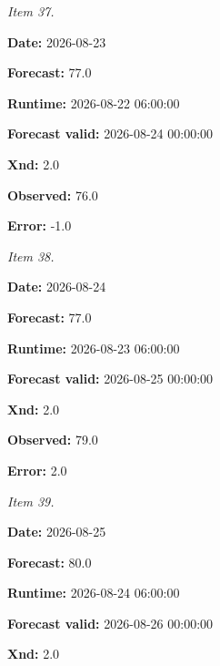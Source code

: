 \documentclass[11pt]{article}
\begin{document}
\par\noindent\textit{Item 37.}\par \par\noindent\textbf{Date:} 2026-08-23

\par\noindent\textbf{Forecast:} 77.0

\par\noindent\textbf{Runtime:} 2026-08-22 06:00:00

\par\noindent\textbf{Forecast valid:} 2026-08-24 00:00:00

\par\noindent\textbf{Xnd:} 2.0

\par\noindent\textbf{Observed:} 76.0

\par\noindent\textbf{Error:} -1.0

\par\noindent\textit{Item 38.}\par \par\noindent\textbf{Date:} 2026-08-24

\par\noindent\textbf{Forecast:} 77.0

\par\noindent\textbf{Runtime:} 2026-08-23 06:00:00

\par\noindent\textbf{Forecast valid:} 2026-08-25 00:00:00

\par\noindent\textbf{Xnd:} 2.0

\par\noindent\textbf{Observed:} 79.0

\par\noindent\textbf{Error:} 2.0

\par\noindent\textit{Item 39.}\par \par\noindent\textbf{Date:} 2026-08-25

\par\noindent\textbf{Forecast:} 80.0

\par\noindent\textbf{Runtime:} 2026-08-24 06:00:00

\par\noindent\textbf{Forecast valid:} 2026-08-26 00:00:00

\par\noindent\textbf{Xnd:} 2.0
\end{document}
